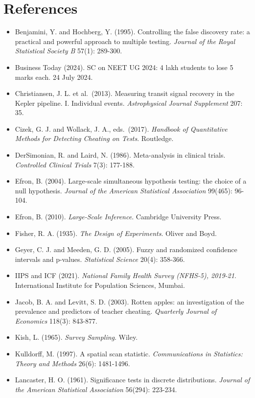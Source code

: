 \documentclass[11pt]{article}
\begin{document}
\section*{References}
\begin{small}
\begin{itemize}[leftmargin=1em,label={}]
\item Benjamini, Y. and Hochberg, Y. (1995). Controlling the false discovery rate: a practical and powerful approach to multiple testing. \textit{Journal of the Royal Statistical Society B} 57(1): 289-300.
\item Business Today (2024). SC on NEET UG 2024: 4 lakh students to lose 5 marks each. 24 July 2024.
\item Christiansen, J. L. et al.\ (2013). Measuring transit signal recovery in the Kepler pipeline. I. Individual events. \textit{Astrophysical Journal Supplement} 207: 35.
\item Cizek, G. J. and Wollack, J. A., eds.\ (2017). \textit{Handbook of Quantitative Methods for Detecting Cheating on Tests}. Routledge.
\item DerSimonian, R. and Laird, N. (1986). Meta-analysis in clinical trials. \textit{Controlled Clinical Trials} 7(3): 177-188.
\item Efron, B. (2004). Large-scale simultaneous hypothesis testing: the choice of a null hypothesis. \textit{Journal of the American Statistical Association} 99(465): 96-104.
\item Efron, B. (2010). \textit{Large-Scale Inference}. Cambridge University Press.
\item Fisher, R. A. (1935). \textit{The Design of Experiments}. Oliver and Boyd.
\item Geyer, C. J. and Meeden, G. D. (2005). Fuzzy and randomized confidence intervals and p-values. \textit{Statistical Science} 20(4): 358-366.
\item IIPS and ICF (2021). \textit{National Family Health Survey (NFHS-5), 2019-21}. International Institute for Population Sciences, Mumbai.
\item Jacob, B. A. and Levitt, S. D. (2003). Rotten apples: an investigation of the prevalence and predictors of teacher cheating. \textit{Quarterly Journal of Economics} 118(3): 843-877.
\item Kish, L. (1965). \textit{Survey Sampling}. Wiley.
\item Kulldorff, M. (1997). A spatial scan statistic. \textit{Communications in Statistics: Theory and Methods} 26(6): 1481-1496.
\item Lancaster, H. O. (1961). Significance tests in discrete distributions. \textit{Journal of the American Statistical Association} 56(294): 223-234.

\end{itemize}
\end{small}
\end{document}
